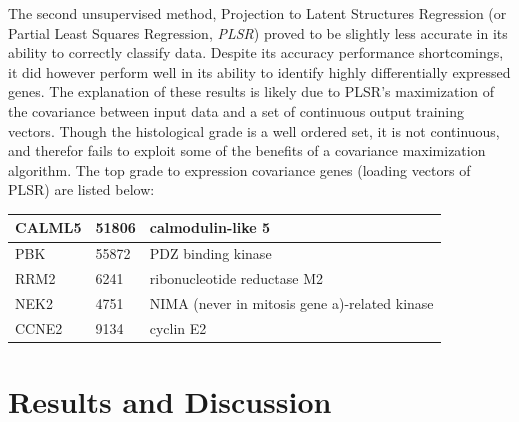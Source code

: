 \documentclass[a4paper,10pt]{article}
\begin{document}
The second unsupervised method, Projection to Latent Structures Regression (or Partial Least Squares Regression, \emph{PLSR})\cite{Wold1} proved to 
be slightly less accurate in its ability to correctly classify data. Despite its accuracy performance shortcomings, it did however
perform well in its ability to identify highly differentially expressed genes. The explanation of these results is likely due to PLSR's maximization of the covariance
between input data and a set of continuous output training vectors. Though the histological grade is a well ordered set, it is not continuous, and therefor fails to
exploit some of the benefits of a covariance maximization algorithm. The top grade to expression covariance genes (loading vectors of PLSR) are listed below:
\begin{center}
\begin{tabular}{| l | l | l |}
\hline
CALML5 & 51806 & calmodulin-like 5\\ \hline
PBK & 55872 & PDZ binding kinase\\ \hline
RRM2 & 6241 & ribonucleotide reductase M2\\ \hline
NEK2 & 4751 & NIMA (never in mitosis gene a)-related kinase\\ \hline
CCNE2 & 9134 & cyclin E2 \\ \hline
 \end{tabular}
\end{center}




\section{Results and Discussion}
\end{document}
